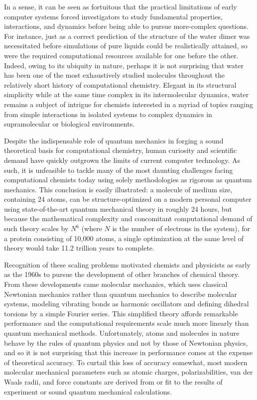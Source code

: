 \documentclass[12pt]{report}
\begin{document}
In a sense, it can be seen as fortuitous that the practical limitations of early computer systems forced investigators to study fundamental properties, interactions, and dynamics before being able to pursue more-complex questions. For instance, just as a correct prediction of the structure of the water dimer was necessitated before simulations of pure liquids could be realistically attained, so were the required computational resources available for one before the other. Indeed, owing to its ubiquity in nature, perhaps it is not surprising that water has been one of the most exhaustively studied molecules \cite{bernal, stillinger, jorg1981, jorg1982, jorg1983, berendsen, mahoney, nada, horn} throughout the relatively short history of computational chemistry. Elegant in its structural simplicity while at the same time complex in its intermolecular dynamics, water remains a subject of intrigue for chemists interested in a myriad of topics ranging from simple interactions in isolated systems to complex dynamics in supramolecular or biological environments. 
 
Despite the indispensable role of quantum mechanics in forging a sound theoretical basis for computational chemistry, human curiosity and scientific demand have quickly outgrown the limits of current computer technology. As such, it is unfeasible to tackle many of the most daunting challenges facing computational chemists today using solely methodologies as rigorous as quantum mechanics. This conclusion is easily illustrated: a molecule of medium size, containing 24 atoms, can be structure-optimized on a modern personal computer using state-of-the-art quantum mechanical theory in roughly 24 hours, but because the mathematical complexity and concomitant computational demand of such theory scales by $N^{6}$ (where $N$ is the number of electrons in the system), \cite{curtiss} for a protein consisting of 10,000 atoms, a single optimization at the same level of theory would take 11.2 trillion years to complete. 

Recognition of these scaling problems motivated chemists and physicists as early as the 1960s to pursue the development of other branches of chemical theory. \cite{pople1, pople2, santry, pople3, allinger, dewar} From these developments came molecular mechanics, \cite{allinger, jorg1988} which uses classical Newtonian mechanics rather than quantum mechanics to describe molecular systems, modeling vibrating bonds as harmonic oscillators and defining dihedral torsions by a simple Fourier series. This simplified theory affords remarkable performance and the computational requirements scale much more linearly than quantum mechanical methods. Unfortunately, atoms and molecules in nature behave by the rules of quantum physics and not by those of Newtonian physics, and so it is not surprising that this increase in performance comes at the expense of theoretical accuracy. To curtail this loss of accuracy somewhat, most modern molecular mechanical parameters such as atomic charges, polarizabilities, van der Waals radii, and force constants are derived from or fit to the results of experiment or sound quantum mechanical calculations. \cite{jorg1988, jorg1996}
\end{document}
